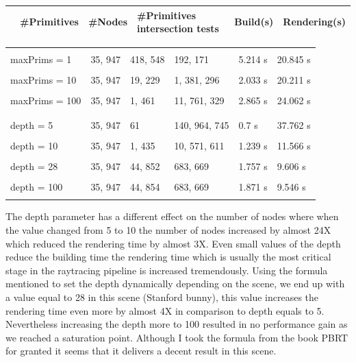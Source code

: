 \documentclass[11pt,a4paper]{article}
\newcommand\Includegraphics[2][]{\sbox{\mybox}{%
\texttt{[image: \#2]}}\abovebaseline[-.5\ht\mybox]{%
\addstackgap{\usebox{\mybox}}}}
\begin{document}
\begin{table}[ht] 
\centering 
{\footnotesize
\begin{tabular}{ P{2.5cm} ||P{2.3cm}  P{2.3cm}  P{2.3cm} P{2.3cm}  P{2.3cm}}      %
\hline\hline                                      %
\Includegraphics[height=1in]{images/stanford-bunny-black.png}
& \#Primitives  & \#Nodes & \#Primitives intersection tests & Build(s) & Rendering(s) \\ [0.5ex] %
\hline
    \end{tabular}
}
\end{table}
\vspace{-2em}
\begin{table}[ht] 
\centering 
{\footnotesize
\begin{tabular}{ P{2.5cm} ||P{2.3cm}  P{2.3cm}  P{2.3cm} P{2.3cm}  P{2.3cm} }      %
 \hline
\\
maxPrims = 1& 35, 947 & 418, 548 & 192, 171 &  5.214 s & 20.845 s\\
\\
maxPrims = 10& 35, 947 & 19, 229 & 1, 381, 296 & 2.033 s & 20.211 s\\
\\
maxPrims = 100& 35, 947 & 1, 461 & 11, 761, 329 & 2.865 s & 24.062 s\\
\\
\hline \hline
\\
depth = 5 & 35, 947 & 61 & 140, 964, 745 &  0.7 s & 37.762 s \\
\\
depth = 10& 35, 947 & 1, 435 & 10, 571, 611 & 1.239 s & 11.566 s\\
\\
depth = 28& 35, 947 & 44, 852 & 683, 669 & 1.757 s & 9.606 s\\
\\
depth = 100& 35, 947 & 44, 854 & 683, 669 & 1.871 s & 9.546 s\\
\\
\hline \hline
    \end{tabular}
}
\end{table}

The depth parameter has a different effect on the number of nodes where when the value changed from 5 to 10 the number of nodes increased by almost 24X which reduced the rendering time by almost 3X.  Even small values of the depth reduce the building time the rendering time which is usually the most critical stage in the raytracing pipeline is increased tremendously. Using the formula mentioned to set the depth dynamically depending on the scene, we end up with a value equal to 28 in this scene (Stanford bunny), this value increases the rendering time even more by almost 4X in comparison to depth equals to 5. Nevertheless increasing the depth more to 100 resulted in no performance gain as we reached a saturation point. Although I took the formula from the book PBRT for granted it seems that it delivers a decent result in this scene. 
\\
\noindent
\end{document}
